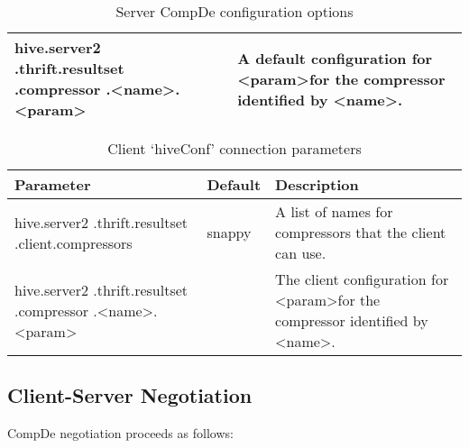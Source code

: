 \documentclass[11pt,a4paper]{article}
\begin{document}
\begin{table}[H]
\begin{tabular}{| p{3.3cm} | p{1.8cm} | p{6.1cm} |}
				hive.server2\linebreak
				.thrift.resultset\linebreak
				.compressor\linebreak
				.\textless name\textgreater.\textless param\textgreater
				&
				& A default configuration for \textless param\textgreater\space for the compressor identified by \textless name\textgreater. 
				\\ \hline
				
			\end{tabular}
			\caption{Server CompDe configuration options}
		\end{table}
		
		\begin{table}[H]
			\begin{tabular}{| p{3.2cm} | p{1.8cm} | p{6.1cm} |} \hline
				
				\textbf{Parameter} & \textbf{Default} & \textbf{Description} \\ \hline
				
				hive.server2\linebreak
				.thrift.resultset\linebreak
				.client.compressors
				& snappy
				& A list of names for compressors that the client can use. 
				\\ \hline
				
				hive.server2\linebreak
				.thrift.resultset\linebreak
				.compressor\linebreak
				.\textless name\textgreater.\textless param\textgreater
				&
				& The client configuration for \textless param\textgreater\space for the compressor identified by \textless name\textgreater.
				\\ \hline
				
			\end{tabular}
			\caption{Client `hiveConf' connection parameters}
		\end{table}
		
	\subsection{Client-Server Negotiation}
		
		CompDe negotiation proceeds as follows:
		
\end{document}
